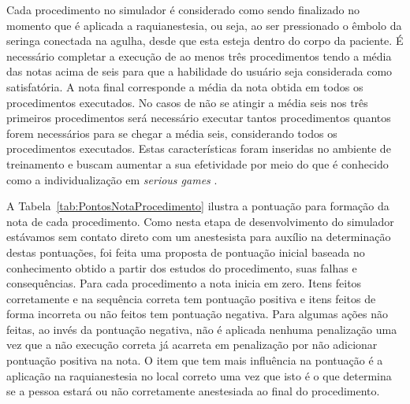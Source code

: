 Cada procedimento no simulador é considerado como sendo finalizado no momento que é aplicada a raquianestesia, ou seja, ao ser pressionado o êmbolo da seringa conectada na agulha, desde que esta esteja dentro do corpo da paciente.
É necessário completar a execução de ao menos três procedimentos tendo a média das notas acima de seis para que a habilidade do usuário seja considerada como satisfatória. A nota final corresponde a média da nota obtida em todos os procedimentos executados. No casos de não se atingir a média seis nos três primeiros procedimentos será necessário executar tantos procedimentos quantos forem necessários para se chegar a média seis, considerando todos os procedimentos executados. Estas características foram inseridas no ambiente de treinamento e buscam aumentar a sua efetividade por meio do que é conhecido como a individualização em \textit{serious games} \cite{Sajjadi2022}.

A Tabela~\ref{tab:PontosNotaProcedimento} ilustra a pontuação para formação da nota de cada procedimento. Como nesta etapa de desenvolvimento do simulador estávamos sem contato direto com um anestesista para auxílio na determinação destas pontuações, foi feita uma proposta de pontuação inicial baseada no conhecimento obtido a partir dos estudos do procedimento, suas falhas e consequências. Para cada procedimento a nota inicia em zero. Itens feitos corretamente e na sequência correta tem pontuação positiva e itens feitos de forma incorreta ou não feitos tem pontuação negativa. Para algumas ações não feitas, ao invés da pontuação negativa, não é aplicada nenhuma penalização uma vez que a não execução correta já acarreta em penalização por não adicionar pontuação positiva na nota. O item que tem mais influência na pontuação é a aplicação na raquianestesia no local correto uma vez que isto é o que determina se a pessoa estará ou não corretamente anestesiada ao final do procedimento.

